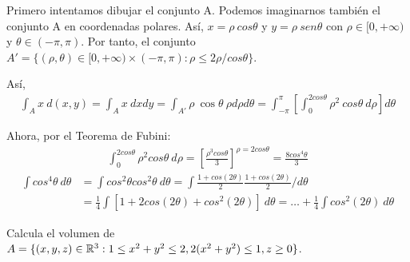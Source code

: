 \begin{sol}
    Primero intentamos dibujar el conjunto A. Podemos imaginarnos también el conjunto A en coordenadas polares. Así, $x = \rho \ cos \theta$ y $y = \rho \ sen \theta $ con $\rho \in [0, +\infty)$ y $\theta \in (-\pi, \pi)$. Por tanto, el conjunto $A' = \{ (\rho, \theta) \in [0, +\infty) \times (-\pi, \pi) : \rho \leq 2 \rho / cos \theta \}$.

    Así, \begin{align*}
        \displaystyle \int_A x \ d(x,y) = \int_A x \ dxdy = \int_{A'} \rho \ \cos \theta \ \rho d\rho d\theta= \int_{-\pi}^{\pi} \left[ \int_0^{2cos \theta}  \rho^2 \ cos \theta \ d\rho\right]d\theta
    \end{align*}

    Ahora, por el Teorema de Fubini:
    \begin{align*}
    \int_0^{2cos\theta} \rho^2 cos \theta \ d\rho = \left[ \frac{\rho^3cos\theta}{3} \right]^{\rho = 2cos \theta} = \frac{8cos^4 \theta}{3}
    \end{align*}
    \begin{align*}
        \label{}
        \int cos^4 \theta \ d\theta &= \int cos^2 \theta cos^2 \theta \ d\theta = \int \frac{1 + cos(2\theta)}{2} \frac{1 + cos (2 \theta)}{2} / d \theta \\
                                    &= \frac{1}{4} \int [1 + 2cos(2\theta) + cos^2(2 \theta)] \ d\theta = \hdots + \frac{1}{4} \int cos^2(2\theta) \ d\theta
    \end{align*}
\end{sol}

\begin{ejer}
    Calcula el volumen de $A = \{ (x,y,z) \in \mathbb{R}^3 : 1 \leq x^2 + y^2 \leq 2, 2(x^2+y^2) \leq 1, z \geq 0 \}$.
\end{ejer}

